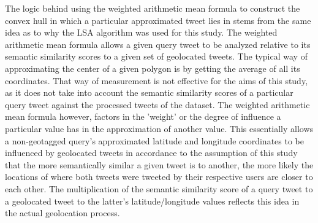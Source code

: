 The logic behind using the weighted arithmetic mean formula to construct the convex hull in which a particular approximated tweet lies in stems from the same idea as to why the LSA algorithm was used for this study. The weighted arithmetic mean formula allows a given query tweet to be analyzed relative to its semantic similarity scores to a given set of geolocated tweets. The typical way of approximating the center of a given polygon is by getting the average of all its coordinates. That way of measurement is not effective for the aims of this study, as it does not take into account the semantic similarity scores of a particular query tweet against the processed tweets of the dataset. The weighted arithmetic mean formula however, factors in the 'weight' or the degree of influence a particular value has in the approximation of another value. This essentially allows a non-geotagged query's approximated latitude and longitude coordinates to be influenced by geolocated tweets in accordance to the assumption of this study that the more semantically similar a given tweet is to another, the more likely the locations of where both tweets were tweeted by their respective users are closer to each other. The multiplication of the semantic similarity score of a query tweet to a geolocated tweet to the latter's latitude/longitude values reflects this idea in the actual geolocation  process.







